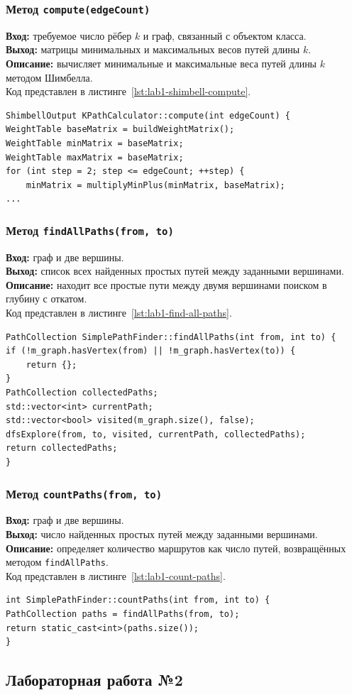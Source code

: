 \documentclass[14pt,a4paper]{extarticle}
\newcommand{\funcblock}[5]{%
\subsubsection*{Метод \code{#1}}
\noindent
\textbf{Вход:} #2\\
\textbf{Выход:} #3\\
\textbf{Описание:} #4\\
Код представлен в листинге~\ref{#5}.%
}
\newcommand{\code}[1]{\texttt{#1}}
\begin{document}
\funcblock
{compute(edgeCount)}
{требуемое число рёбер \(k\) и граф, связанный с объектом класса.}
{матрицы минимальных и максимальных весов путей длины \(k\).}
{вычисляет минимальные и максимальные веса путей длины \(k\) методом Шимбелла.}
{lst:lab1-shimbell-compute}
\begin{lstlisting}[style=cppcode,caption={Фрагмент функции \code{compute(edgeCount)}},label={lst:lab1-shimbell-compute}]
ShimbellOutput KPathCalculator::compute(int edgeCount) {
WeightTable baseMatrix = buildWeightMatrix();
WeightTable minMatrix = baseMatrix;
WeightTable maxMatrix = baseMatrix;
for (int step = 2; step <= edgeCount; ++step) {
    minMatrix = multiplyMinPlus(minMatrix, baseMatrix);
...
\end{lstlisting}

\funcblock
{findAllPaths(from, to)}
{граф и две вершины.}
{список всех найденных простых путей между заданными вершинами.}
{находит все простые пути между двумя вершинами поиском в глубину с откатом.}
{lst:lab1-find-all-paths}
\begin{lstlisting}[style=cppcode,caption={Фрагмент функции \code{findAllPaths(from, to)}},label={lst:lab1-find-all-paths}]
PathCollection SimplePathFinder::findAllPaths(int from, int to) {
if (!m_graph.hasVertex(from) || !m_graph.hasVertex(to)) {
    return {};
}
PathCollection collectedPaths;
std::vector<int> currentPath;
std::vector<bool> visited(m_graph.size(), false);
dfsExplore(from, to, visited, currentPath, collectedPaths);
return collectedPaths;
}
\end{lstlisting}

\funcblock
{countPaths(from, to)}
{граф и две вершины.}
{число найденных простых путей между заданными вершинами.}
{определяет количество маршрутов как число путей, возвращённых методом \code{findAllPaths}.}
{lst:lab1-count-paths}
\begin{lstlisting}[style=cppcode,caption={Фрагмент функции \code{countPaths(from, to)}},label={lst:lab1-count-paths}]
int SimplePathFinder::countPaths(int from, int to) {
PathCollection paths = findAllPaths(from, to);
return static_cast<int>(paths.size());
}
\end{lstlisting}

\subsection{Лабораторная работа №2}
\end{document}
